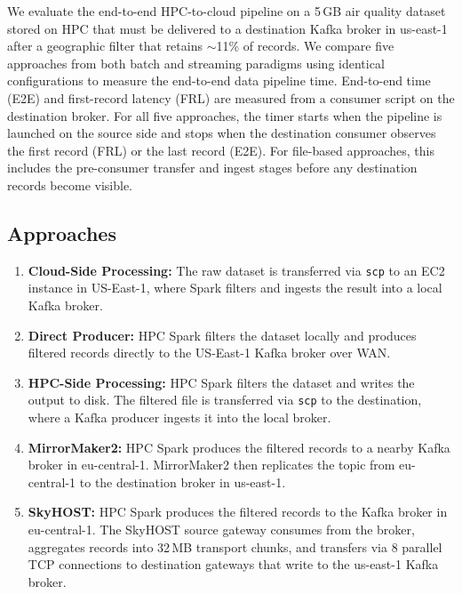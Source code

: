 \documentclass[runningheads]{llncs}
\begin{document}
We evaluate the end-to-end HPC-to-cloud pipeline on a 5\,GB air quality dataset stored on HPC that must be delivered to a destination Kafka broker in us-east-1 after a geographic filter that retains $\sim$11\% of records. We compare five approaches from both batch and streaming paradigms using identical configurations to measure the end-to-end data pipeline time. End-to-end time (E2E) and first-record latency (FRL) are measured from a consumer script on the destination broker. For all five approaches, the timer starts when the pipeline is launched on the source side and stops when the destination consumer observes the first record (FRL) or the last record (E2E). For file-based approaches, this includes the pre-consumer transfer and ingest stages before any destination records become visible.


\subsection{Approaches}

\begin{enumerate}
\item \textbf{Cloud-Side Processing:} The raw dataset is transferred via \texttt{scp} to an EC2 instance in US-East-1, where Spark filters and ingests the result into a local Kafka broker. 

\item \textbf{Direct Producer:} HPC Spark filters the dataset locally and produces filtered records directly to the US-East-1 Kafka broker over WAN.

\item \textbf{HPC-Side Processing:} HPC Spark filters the dataset and writes the output to disk. The filtered file is transferred via \texttt{scp} to the destination, where a Kafka producer ingests it into the local broker.

\item \textbf{MirrorMaker2:} HPC Spark produces the filtered records to a nearby Kafka broker in eu-central-1. MirrorMaker2 then replicates the topic from eu-central-1 to the destination broker in us-east-1.


\item \textbf{SkyHOST:} HPC Spark produces the filtered records to the Kafka broker in eu-central-1. The SkyHOST source gateway consumes from the broker, aggregates records into 32\,MB transport chunks, and transfers via 8 parallel TCP connections to destination gateways that write to the us-east-1 Kafka broker.

\end{enumerate}
\end{document}
